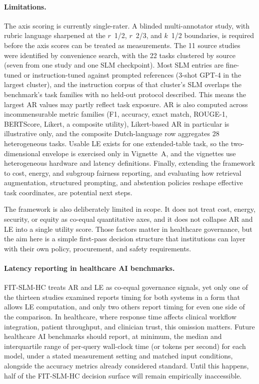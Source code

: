 \documentclass[11pt]{article}
\begin{document}
\paragraph{Limitations.}
The axis scoring is currently single-rater. A blinded multi-annotator study, with rubric language sharpened at the $r$~1/2, $r$~2/3, and $k$~1/2 boundaries, is required before the axis scores can be treated as measurements. The 11 source studies were identified by convenience search, with the 22 tasks clustered by source (seven from one study and one SLM checkpoint). Most SLM entries are fine-tuned or instruction-tuned against prompted references (3-shot GPT-4 in the largest cluster), and the instruction corpus of that cluster's SLM overlaps the benchmark's task families with no held-out protocol described. This means the largest AR values may partly reflect task exposure. AR is also computed across incommensurable metric families (F1, accuracy, exact match, ROUGE-1, BERTScore, Likert, a composite utility), Likert-based AR in particular is illustrative only, and the composite Dutch-language row aggregates 28 heterogeneous tasks. Usable LE exists for one extended-table task, so the two-dimensional envelope is exercised only in Vignette~A, and the vignettes use heterogeneous hardware and latency definitions. Finally, extending the framework to cost, energy, and subgroup fairness reporting, and evaluating how retrieval augmentation, structured prompting, and abstention policies reshape effective task coordinates, are potential next steps.

The framework is also deliberately limited in scope. It does not treat cost, energy, security, or equity as co-equal quantitative axes, and it does not collapse AR and LE into a single utility score. Those factors matter in healthcare governance, but the aim here is a simple first-pass decision structure that institutions can layer with their own policy, procurement, and safety requirements.

\paragraph{Latency reporting in healthcare AI benchmarks.}
FIT-SLM-HC treats AR and LE as co-equal governance signals, yet only one of the thirteen studies examined reports timing for both systems in a form that allows LE computation, and only two others report timing for even one side of the comparison. In healthcare, where response time affects clinical workflow integration, patient throughput, and clinician trust, this omission matters. Future healthcare AI benchmarks should report, at minimum, the median and interquartile range of per-query wall-clock time (or tokens per second) for each model, under a stated measurement setting and matched input conditions, alongside the accuracy metrics already considered standard. Until this happens, half of the FIT-SLM-HC decision surface will remain empirically inaccessible.
\end{document}
